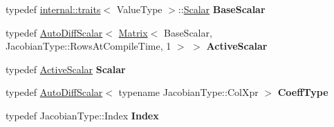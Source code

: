 \begin{DoxyCompactItemize}
typedef \hyperlink{struct_eigen_1_1internal_1_1traits}{internal\+::traits}$<$ Value\+Type $>$\+::\hyperlink{class_eigen_1_1_auto_diff_scalar}{Scalar} {\bfseries Base\+Scalar}
\item 
\mbox{\label{class_eigen_1_1_auto_diff_vector_a048526857fa96b35452716b4da209591}} 
typedef \hyperlink{class_eigen_1_1_auto_diff_scalar}{Auto\+Diff\+Scalar}$<$ \hyperlink{group___core___module_class_eigen_1_1_matrix}{Matrix}$<$ Base\+Scalar, Jacobian\+Type\+::\+Rows\+At\+Compile\+Time, 1 $>$ $>$ {\bfseries Active\+Scalar}
\item 
\mbox{\label{class_eigen_1_1_auto_diff_vector_aece477c877459511bbaf4aab630727ea}} 
typedef \hyperlink{class_eigen_1_1_auto_diff_scalar}{Active\+Scalar} {\bfseries Scalar}
\item 
\mbox{\label{class_eigen_1_1_auto_diff_vector_a3b6605c69ba58741f7b88e91a1edf501}} 
typedef \hyperlink{class_eigen_1_1_auto_diff_scalar}{Auto\+Diff\+Scalar}$<$ typename Jacobian\+Type\+::\+Col\+Xpr $>$ {\bfseries Coeff\+Type}
\item 
\mbox{\label{class_eigen_1_1_auto_diff_vector_a49bfdebfc40fc86a3043fbbc458c667d}} 
typedef Jacobian\+Type\+::\+Index {\bfseries Index}
\end{DoxyCompactItemize}

